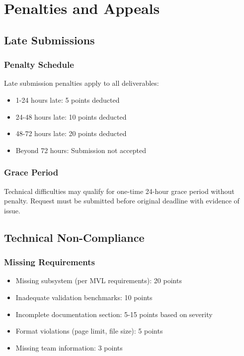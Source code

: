 
\renewcommand{\thesection}{PA}
\section{Penalties and Appeals}

\subsection{Late Submissions}

\subsubsection{Penalty Schedule}
Late submission penalties apply to all deliverables:
\begin{itemize}[noitemsep]
    \item 1-24 hours late: 5 points deducted
    \item 24-48 hours late: 10 points deducted
    \item 48-72 hours late: 20 points deducted
    \item Beyond 72 hours: Submission not accepted
\end{itemize}

\subsubsection{Grace Period}
Technical difficulties may qualify for one-time 24-hour grace period without penalty. Request must be submitted before original deadline with evidence of issue.

\subsection{Technical Non-Compliance}

\subsubsection{Missing Requirements}
\begin{itemize}[noitemsep]
    \item Missing subsystem (per MVL requirements): 20 points
    \item Inadequate validation benchmarks: 10 points
    \item Incomplete documentation section: 5-15 points based on severity
    \item Format violations (page limit, file size): 5 points
    \item Missing team information: 3 points
\end{itemize}

